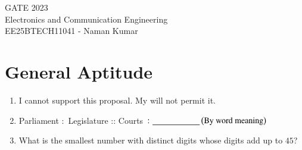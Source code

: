 \documentclass[a4paper, 11pt]{article}
\begin{document}
\begin{center}
    \huge{GATE 2023}\\
    \large{Electronics and Communication Engineering }\\
    \large{EE25BTECH11041 - Naman Kumar}
\end{center}

\section*{General Aptitude }

\begin{enumerate}
    \item I cannot support this proposal. My \underline{\hspace{2cm}} will not permit it.
    \begin{enumerate}
    \end{enumerate}
    
    \hfill{}
    
    \item Parliament $\colon$ Legislature :: Courts $\colon \underline{\hspace{2cm}} \left(\text{By word meaning}\right)$
    \begin{enumerate}
    \end{enumerate}
    
    \hfill{}
    
    \item What is the smallest number with distinct digits whose digits add up to $45$?
    \begin{enumerate}
    \end{enumerate}
    

\end{enumerate}
\end{document}
